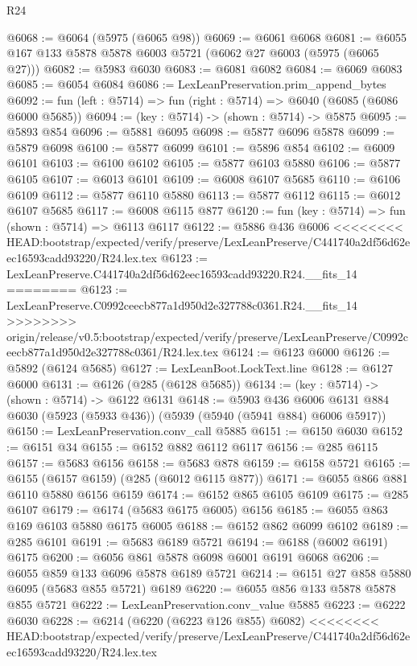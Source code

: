 \begin{lexlean}{R24}
\begin{coremodule}
{{{{{{{{{{{{{{{{{{{{{{{{{{{{{{{{{{{{{{{{{{{{{{{{{{{{{{{{{{{{{{{{{{{{{{{{{{{{{{{{{{{{{{{{{{{{{{{{{{{{{{{{{{{{{{{{{{{{{{{{{{{{{{{{{{{{{{{{{{{{{{{{{{{{{{{{{{{{{{{{{{{{{{{{{{{{{{{{{{{{{{{{{{{{{{{{{{{@6068 := @6064 (@5975 (@6065 @98))
@6069 := @6061 @6068
@6081 := @6055 @167 @133 @5878 @5878 @6003 @5721 (@6062 @27 @6003 (@5975 (@6065 @27)))
@6082 := @5983 @6030
@6083 := @6081 @6082
@6084 := @6069 @6083
@6085 := @6054 @6084
@6086 := LexLeanPreservation.prim_append_bytes
@6092 := fun (left : @5714) => fun (right : @5714) => @6040 (@6085 (@6086 @6000 @5685))
@6094 := (key : @5714) -> (shown : @5714) -> @5875
@6095 := @5893 @854
@6096 := @5881 @6095
@6098 := @5877 @6096 @5878
@6099 := @5879 @6098
@6100 := @5877 @6099
@6101 := @5896 @854
@6102 := @6009 @6101
@6103 := @6100 @6102
@6105 := @5877 @6103 @5880
@6106 := @5877 @6105
@6107 := @6013 @6101
@6109 := @6008 @6107 @5685
@6110 := @6106 @6109
@6112 := @5877 @6110 @5880
@6113 := @5877 @6112
@6115 := @6012 @6107 @5685
@6117 := @6008 @6115 @877
@6120 := fun (key : @5714) => fun (shown : @5714) => @6113 @6117
@6122 := @5886 @436 @6006
<<<<<<<< HEAD:bootstrap/expected/verify/preserve/LexLeanPreserve/C441740a2df56d62eec16593cadd93220/R24.lex.tex
@6123 := LexLeanPreserve.C441740a2df56d62eec16593cadd93220.R24.__fits_14
========
@6123 := LexLeanPreserve.C0992ceecb877a1d950d2e327788c0361.R24.__fits_14
>>>>>>>> origin/release/v0.5:bootstrap/expected/verify/preserve/LexLeanPreserve/C0992ceecb877a1d950d2e327788c0361/R24.lex.tex
@6124 := @6123 @6000
@6126 := @5892 (@6124 @5685)
@6127 := LexLeanBoot.LockText.line
@6128 := @6127 @6000
@6131 := @6126 (@285 (@6128 @5685))
@6134 := (key : @5714) -> (shown : @5714) -> @6122 @6131
@6148 := @5903
    @436
    @6006
    @6131
    @884
    @6030
    (@5923 (@5933 @436))
    (@5939 (@5940 (@5941 @884) @6006 @5917))
@6150 := LexLeanPreservation.conv_call @5885
@6151 := @6150 @6030
@6152 := @6151 @34
@6155 := @6152 @882 @6112 @6117
@6156 := @285 @6115
@6157 := @5683 @6156
@6158 := @5683 @878
@6159 := @6158 @5721
@6165 := @6155 (@6157 @6159) (@285 (@6012 @6115 @877))
@6171 := @6055 @866 @881 @6110 @5880 @6156 @6159
@6174 := @6152 @865 @6105 @6109
@6175 := @285 @6107
@6179 := @6174 (@5683 @6175 @6005) @6156
@6185 := @6055 @863 @169 @6103 @5880 @6175 @6005
@6188 := @6152 @862 @6099 @6102
@6189 := @285 @6101
@6191 := @5683 @6189 @5721
@6194 := @6188 (@6002 @6191) @6175
@6200 := @6056 @861 @5878 @6098 @6001 @6191 @6068
@6206 := @6055 @859 @133 @6096 @5878 @6189 @5721
@6214 := @6151 @27 @858 @5880 @6095 (@5683 @855 @5721) @6189
@6220 := @6055 @856 @133 @5878 @5878 @855 @5721
@6222 := LexLeanPreservation.conv_value @5885
@6223 := @6222 @6030
@6228 := @6214 (@6220 (@6223 @126 @855) @6082)
<<<<<<<< HEAD:bootstrap/expected/verify/preserve/LexLeanPreserve/C441740a2df56d62eec16593cadd93220/R24.lex.tex
}}}}}}}}}}}}}}}}}}}}}}}}}}}}}}}}}}}}}}}}}}}}}}}}}}}}}}}}}}}}}}}}}}}}}}}}}}}}}}}}}}}}}}}}}}}}}}}}}}}}}}}}}}}}}}}}}}}}}}}}}}}}}}}}}}}}}}}}}}}}}}}}}}}}}}}}}}}}}}}}}}}}}}}}}}}}}}}}}}}}}}}}}}}}}}}}}}}
\end{coremodule}
\end{lexlean}
